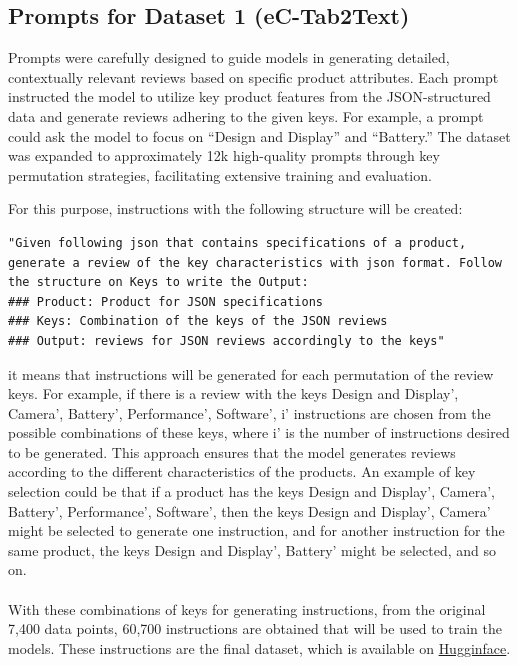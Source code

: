 \subsection{Prompts for Dataset 1 (eC-Tab2Text)}
Prompts were carefully designed to guide models in generating detailed, contextually relevant reviews based on specific product attributes. Each prompt instructed the model to utilize key product features from the JSON-structured data and generate reviews adhering to the given keys. For example, a prompt could ask the model to focus on ``Design and Display'' and ``Battery.'' The dataset was expanded to approximately 12k high-quality prompts through key permutation strategies, facilitating extensive training and evaluation.

For this purpose, instructions with the following structure will be created:
\begin{lstlisting}[style=textstyle, frame = single, caption=Prompt structuration, label=code:prompt-structuration]
"Given following json that contains specifications of a product, generate a review of the key characteristics with json format. Follow the structure on Keys to write the Output: 
### Product: Product for JSON specifications
### Keys: Combination of the keys of the JSON reviews
### Output: reviews for JSON reviews accordingly to the keys"
\end{lstlisting}
it means that instructions will be generated for each permutation of the review keys. For example, if there is a review with the keys Design and Display', Camera', Battery', Performance', Software', i' instructions are chosen from the possible combinations of these keys, where i' is the number of instructions desired to be generated. This approach ensures that the model generates reviews according to the different characteristics of the products. An example of key selection could be that if a product has the keys Design and Display', Camera', Battery', Performance', Software', then the keys Design and Display', Camera' might be selected to generate one instruction, and for another instruction for the same product, the keys Design and Display', Battery' might be selected, and so on.
\\\\
With these combinations of keys for generating instructions, from the original 7,400 data points, 60,700 instructions are obtained that will be used to train the models. These instructions are the final dataset, which is available on \href{https://huggingface.co/datasets/kokujin/json_data_luis}{Hugginface}.

